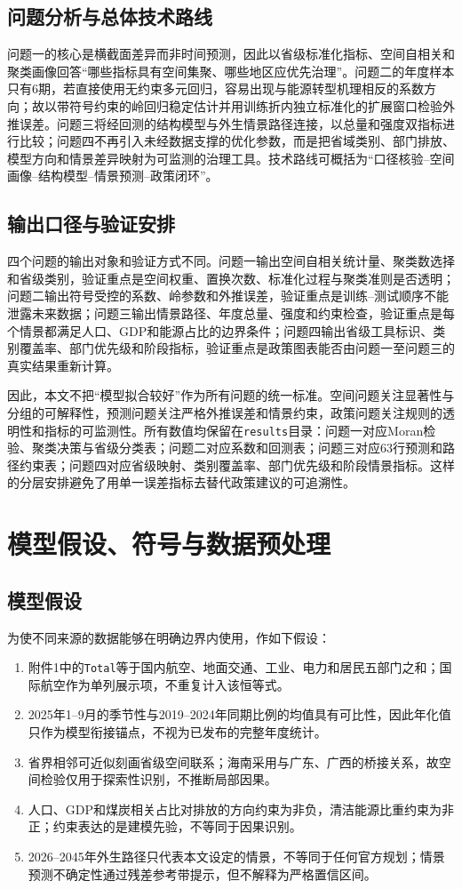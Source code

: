 \documentclass[12pt,a4paper]{ctexart}
\theoremstyle{definition}
\theoremstyle{plain}
\theoremstyle{remark}
\begin{document}
\subsection{问题分析与总体技术路线}
问题一的核心是横截面差异而非时间预测，因此以省级标准化指标、空间自相关和聚类画像回答“哪些指标具有空间集聚、哪些地区应优先治理”。问题二的年度样本只有6期，若直接使用无约束多元回归，容易出现与能源转型机理相反的系数方向；故以带符号约束的岭回归稳定估计并用训练折内独立标准化的扩展窗口检验外推误差。问题三将经回测的结构模型与外生情景路径连接，以总量和强度双指标进行比较；问题四不再引入未经数据支撑的优化参数，而是把省域类别、部门排放、模型方向和情景差异映射为可监测的治理工具。技术路线可概括为“口径核验--空间画像--结构模型--情景预测--政策闭环”。

\subsection{输出口径与验证安排}
四个问题的输出对象和验证方式不同。问题一输出空间自相关统计量、聚类数选择和省级类别，验证重点是空间权重、置换次数、标准化过程与聚类准则是否透明；问题二输出符号受控的系数、岭参数和外推误差，验证重点是训练--测试顺序不能泄露未来数据；问题三输出情景路径、年度总量、强度和约束检查，验证重点是每个情景都满足人口、GDP和能源占比的边界条件；问题四输出省级工具标识、类别覆盖率、部门优先级和阶段指标，验证重点是政策图表能否由问题一至问题三的真实结果重新计算。

因此，本文不把“模型拟合较好”作为所有问题的统一标准。空间问题关注显著性与分组的可解释性，预测问题关注严格外推误差和情景约束，政策问题关注规则的透明性和指标的可监测性。所有数值均保留在\texttt{results}目录：问题一对应Moran检验、聚类决策与省级分类表；问题二对应系数和回测表；问题三对应63行预测和路径约束表；问题四对应省级映射、类别覆盖率、部门优先级和阶段情景指标。这样的分层安排避免了用单一误差指标去替代政策建议的可追溯性。
\section{模型假设、符号与数据预处理}

\subsection{模型假设}
为使不同来源的数据能够在明确边界内使用，作如下假设：
\begin{enumerate}[label=(\arabic*)]
\item 附件1中的\texttt{Total}等于国内航空、地面交通、工业、电力和居民五部门之和；国际航空作为单列展示项，不重复计入该恒等式。
\item 2025年1--9月的季节性与2019--2024年同期比例的均值具有可比性，因此年化值只作为模型衔接锚点，不视为已发布的完整年度统计。
\item 省界相邻可近似刻画省级空间联系；海南采用与广东、广西的桥接关系，故空间检验仅用于探索性识别，不推断局部因果。
\item 人口、GDP和煤炭相关占比对排放的方向约束为非负，清洁能源比重约束为非正；约束表达的是建模先验，不等同于因果识别。
\item 2026--2045年外生路径只代表本文设定的情景，不等同于任何官方规划；情景预测不确定性通过残差参考带提示，但不解释为严格置信区间。
\end{enumerate}
\end{document}
